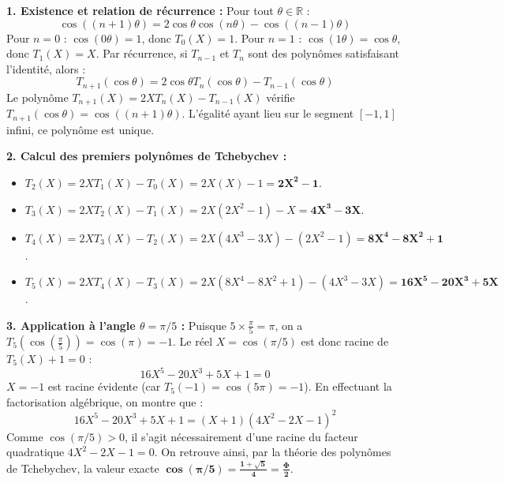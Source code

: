 \documentclass[11pt,a4paper]{article}
\newcommand{\R}{\mathbb{R}}
\begin{document}
\begin{correctionbox}
\textbf{1. Existence et relation de récurrence :}
Pour tout $\theta \in \R$ :
\[
\cos((n+1)\theta) = 2\cos\theta \cos(n\theta) - \cos((n-1)\theta)
\]
Pour $n = 0$ : $\cos(0\theta) = 1$, donc $T_0(X) = 1$.
Pour $n = 1$ : $\cos(1\theta) = \cos\theta$, donc $T_1(X) = X$.
Par récurrence, si $T_{n-1}$ et $T_n$ sont des polynômes satisfaisant l'identité, alors :
\[
T_{n+1}(\cos\theta) = 2\cos\theta T_n(\cos\theta) - T_{n-1}(\cos\theta)
\]
Le polynôme $T_{n+1}(X) = 2X T_n(X) - T_{n-1}(X)$ vérifie $T_{n+1}(\cos\theta) = \cos((n+1)\theta)$.
L'égalité ayant lieu sur le segment $[-1, 1]$ infini, ce polynôme est unique.

\textbf{2. Calcul des premiers polynômes de Tchebychev :}
\begin{itemize}[label=$\bullet$]
    \item $T_2(X) = 2X T_1(X) - T_0(X) = 2X(X) - 1 = \mathbf{2X^2 - 1}$.
    \item $T_3(X) = 2X T_2(X) - T_1(X) = 2X(2X^2 - 1) - X = \mathbf{4X^3 - 3X}$.
    \item $T_4(X) = 2X T_3(X) - T_2(X) = 2X(4X^3 - 3X) - (2X^2 - 1) = \mathbf{8X^4 - 8X^2 + 1}$.
    \item $T_5(X) = 2X T_4(X) - T_3(X) = 2X(8X^4 - 8X^2 + 1) - (4X^3 - 3X) = \mathbf{16X^5 - 20X^3 + 5X}$.
\end{itemize}

\textbf{3. Application à l'angle $\theta = \pi/5$ :}
Puisque $5 \times \frac{\pi}{5} = \pi$, on a $T_5\left(\cos\left(\frac{\pi}{5}\right)\right) = \cos(\pi) = -1$.
Le réel $X = \cos(\pi/5)$ est donc racine de $T_5(X) + 1 = 0$ :
\[
16X^5 - 20X^3 + 5X + 1 = 0
\]
$X = -1$ est racine évidente (car $T_5(-1) = \cos(5\pi) = -1$).
En effectuant la factorisation algébrique, on montre que :
\[
16X^5 - 20X^3 + 5X + 1 = (X + 1)(4X^2 - 2X - 1)^2
\]
Comme $\cos(\pi/5) > 0$, il s'agit nécessairement d'une racine du facteur quadratique $4X^2 - 2X - 1 = 0$.
On retrouve ainsi, par la théorie des polynômes de Tchebychev, la valeur exacte $\mathbf{\cos(\pi/5) = \frac{1+\sqrt{5}}{4} = \frac{\Phi}{2}}$.
\end{correctionbox}
\end{document}

